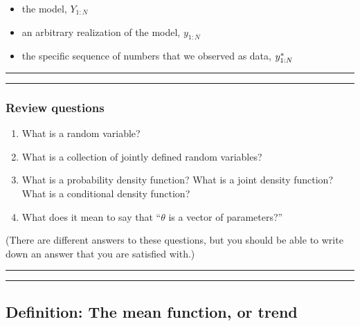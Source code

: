 \documentclass[]{article}
\providecommand{\tightlist}{%
  \setlength{\itemsep}{0pt}\setlength{\parskip}{0pt}}
\begin{document}
\begin{itemize}
  \begin{itemize}
  \tightlist
  \item
    the model, \(Y_{1:N}\)
  \item
    an arbitrary realization of the model, \(y_{1:N}\)
  \item
    the specific sequence of numbers that we observed as data,
    \(y_{1:N}^*\)
  \end{itemize}
\end{itemize}

\begin{center}\rule{0.5\linewidth}{\linethickness}\end{center}

\begin{center}\rule{0.5\linewidth}{\linethickness}\end{center}

\subsubsection{Review questions}\label{review-questions}

\begin{enumerate}
\def\labelenumi{\arabic{enumi}.}
\item
  What is a random variable?
\item
  What is a collection of jointly defined random variables?
\item
  What is a probability density function? What is a joint density
  function? What is a conditional density function?
\item
  What does it mean to say that ``\(\theta\) is a vector of
  parameters?''
\end{enumerate}

(There are different answers to these questions, but you should be able
to write down an answer that you are satisfied with.)

\begin{center}\rule{0.5\linewidth}{\linethickness}\end{center}

\begin{center}\rule{0.5\linewidth}{\linethickness}\end{center}

\subsection{Definition: The mean function, or
trend}\label{definition-the-mean-function-or-trend}
\end{document}
